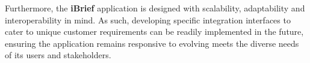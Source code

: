 Furthermore, the \textbf{iBrief} application is designed with scalability, adaptability and interoperability in mind. As such, developing specific integration interfaces to cater to unique customer requirements can be readily implemented in the future, ensuring the application remains responsive to evolving meets the diverse needs of its users and stakeholders.
